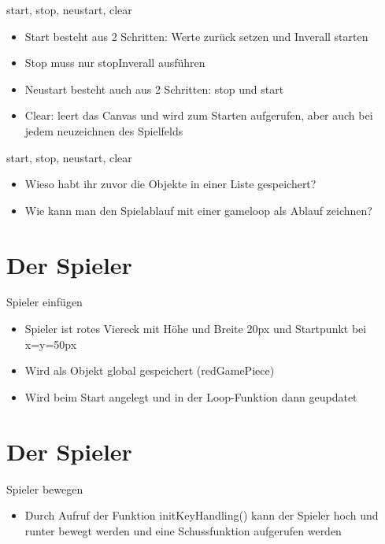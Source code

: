\documentclass[18pt]{beamer}
\begin{document}
\begin{frame}{start, stop, neustart, clear}
\begin{itemize}
	\item Start besteht aus 2 Schritten: Werte zurück setzen und Inverall starten
	\item Stop muss nur stopInverall ausführen
	\item Neustart besteht auch aus 2 Schritten: stop und start
	\item Clear: leert das Canvas und wird zum Starten aufgerufen, aber auch bei jedem neuzeichnen des Spielfelds

\end{itemize}
\end{frame}

\begin{frame}{start, stop, neustart, clear}
\begin{itemize}
	\item Wieso habt ihr zuvor die Objekte in einer Liste gespeichert?
	\item Wie kann man den Spielablauf mit einer gameloop als Ablauf zeichnen?
	
\end{itemize}
\end{frame}


\section{Der Spieler}
\begin{frame}{Spieler einfügen}
\begin{itemize}
	\item Spieler ist rotes Viereck mit Höhe und Breite 20px und Startpunkt bei x=y=50px
	\item Wird als Objekt global gespeichert (redGamePiece)
	\item Wird beim Start angelegt und in der Loop-Funktion dann geupdatet
\end{itemize}
\end{frame}

\section{Der Spieler}
\begin{frame}{Spieler bewegen}
\begin{itemize}
	\item Durch Aufruf der Funktion initKeyHandling() kann der Spieler hoch und runter bewegt werden und eine Schussfunktion aufgerufen werden
\end{itemize}
\end{frame}
\end{document}
